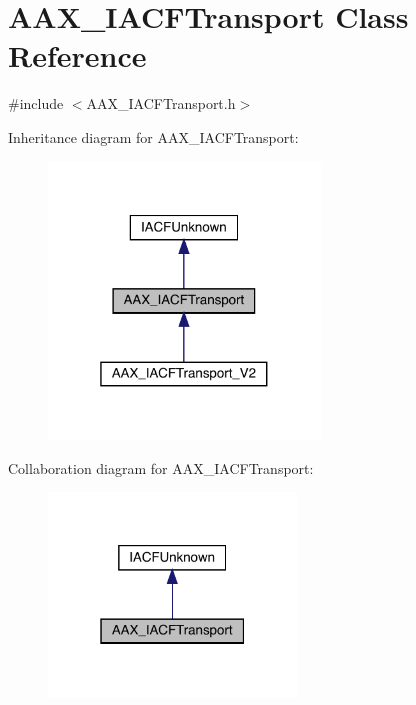 \hypertarget{a01757}{}\section{A\+A\+X\+\_\+\+I\+A\+C\+F\+Transport Class Reference}
\label{a01757}


{\ttfamily \#include $<$A\+A\+X\+\_\+\+I\+A\+C\+F\+Transport.\+h$>$}



Inheritance diagram for A\+A\+X\+\_\+\+I\+A\+C\+F\+Transport\+:
\nopagebreak
\begin{figure}[H]
\begin{center}
\leavevmode
\includegraphics[width=205pt]{a01756}
\end{center}
\end{figure}


Collaboration diagram for A\+A\+X\+\_\+\+I\+A\+C\+F\+Transport\+:
\nopagebreak
\begin{figure}[H]
\begin{center}
\leavevmode
\includegraphics[width=187pt]{a01755}
\end{center}
\end{figure}


